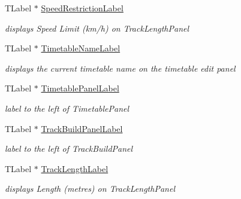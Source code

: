 \begin{DoxyCompactItemize}
\mbox{\label{class_t_interface_a0b36c69d7ea2798f62f0f65b8e5fc632}} 
T\+Label $\ast$ \mbox{\hyperlink{class_t_interface_a0b36c69d7ea2798f62f0f65b8e5fc632}{Speed\+Restriction\+Label}}
\begin{DoxyCompactList}\small\item\em displays \textquotesingle{}Speed Limit (km/h)\textquotesingle{} on Track\+Length\+Panel \end{DoxyCompactList}\item 
\mbox{\label{class_t_interface_a3abffdbcddebbccd64195ad563cf5933}} 
T\+Label $\ast$ \mbox{\hyperlink{class_t_interface_a3abffdbcddebbccd64195ad563cf5933}{Timetable\+Name\+Label}}
\begin{DoxyCompactList}\small\item\em displays the current timetable name on the timetable edit panel \end{DoxyCompactList}\item 
\mbox{\label{class_t_interface_a321b10bd4ed20c62fa41fe6b950cb3b0}} 
T\+Label $\ast$ \mbox{\hyperlink{class_t_interface_a321b10bd4ed20c62fa41fe6b950cb3b0}{Timetable\+Panel\+Label}}
\begin{DoxyCompactList}\small\item\em label to the left of Timetable\+Panel \end{DoxyCompactList}\item 
\mbox{\label{class_t_interface_afbeb8c812aebd7b45f09b09889281a4c}} 
T\+Label $\ast$ \mbox{\hyperlink{class_t_interface_afbeb8c812aebd7b45f09b09889281a4c}{Track\+Build\+Panel\+Label}}
\begin{DoxyCompactList}\small\item\em label to the left of Track\+Build\+Panel \end{DoxyCompactList}\item 
\mbox{\label{class_t_interface_abf62cb5692bcccbba65b85dd6b192f16}} 
T\+Label $\ast$ \mbox{\hyperlink{class_t_interface_abf62cb5692bcccbba65b85dd6b192f16}{Track\+Length\+Label}}
\begin{DoxyCompactList}\small\item\em displays \textquotesingle{}Length (metres)\textquotesingle{} on Track\+Length\+Panel \end{DoxyCompactList}\item 

\end{DoxyCompactItemize}
